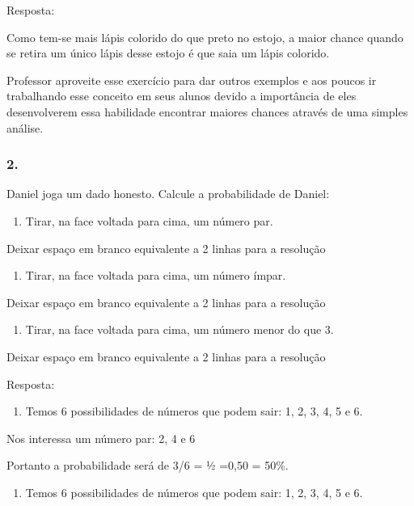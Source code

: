 Resposta:

Como tem-se mais lápis colorido do que preto no estojo, a maior chance
quando se retira um único lápis desse estojo é que saia um lápis
colorido.

Professor aproveite esse exercício para dar outros exemplos e aos poucos
ir trabalhando esse conceito em seus alunos devido a importância de eles
desenvolverem essa habilidade encontrar maiores chances através de uma
simples análise.

\subsubsection{2.}\label{section-79}

Daniel joga um dado honesto. Calcule a probabilidade de Daniel:

\begin{enumerate}
\def\labelenumi{\alph{enumi})}
\item
  Tirar, na face voltada para cima, um número par.
\end{enumerate}

Deixar espaço em branco equivalente a 2 linhas para a resolução

\begin{enumerate}
\def\labelenumi{\alph{enumi})}
\item
  Tirar, na face voltada para cima, um número ímpar.
\end{enumerate}

Deixar espaço em branco equivalente a 2 linhas para a resolução

\begin{enumerate}
\def\labelenumi{\alph{enumi})}
\item
  Tirar, na face voltada para cima, um número menor do que 3.
\end{enumerate}

Deixar espaço em branco equivalente a 2 linhas para a resolução

Resposta:

\begin{enumerate}
\def\labelenumi{\alph{enumi})}
\item
  Temos 6 possibilidades de números que podem sair: 1, 2, 3, 4, 5 e 6.
\end{enumerate}

Nos interessa um número par: 2, 4 e 6

Portanto a probabilidade será de 3/6 = ½ =0,50 = 50\%.

\begin{enumerate}
\def\labelenumi{\alph{enumi})}
\item
  Temos 6 possibilidades de números que podem sair: 1, 2, 3, 4, 5 e 6.
\end{enumerate}

